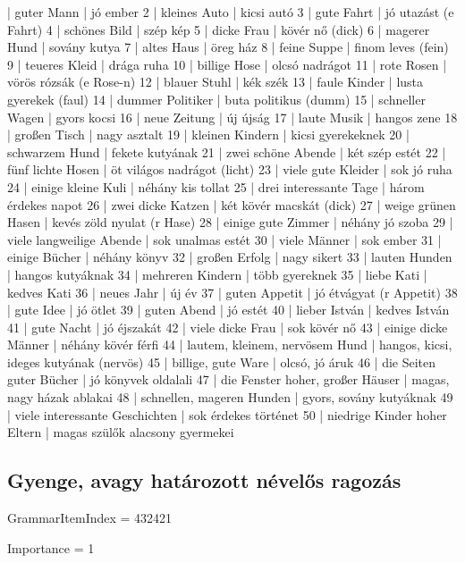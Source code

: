 \documentclass{article}
\newenvironment{exmp}{\verbatim}{\endverbatim}
\begin{document}
\begin{exmp}
1 | guter Mann | jó ember
2 | kleines Auto | kicsi autó
3 | gute Fahrt | jó utazást (e Fahrt)
4 | schönes Bild | szép kép
5 | dicke Frau | kövér nő (dick)
6 | magerer Hund | sovány kutya
7 | altes Haus | öreg ház
8 | feine Suppe | finom leves (fein)
9 | teueres Kleid | drága ruha
10 | billige Hose | olcsó nadrágot
11 | rote Rosen | vörös rózsák (e Rose-n)
12 | blauer Stuhl | kék szék
13 | faule Kinder | lusta gyerekek (faul)
14 | dummer Politiker | buta politikus (dumm)
15 | schneller Wagen | gyors kocsi
16 | neue Zeitung | új újság
17 | laute Musik | hangos zene
18 | großen Tisch | nagy asztalt
19 | kleinen Kindern | kicsi gyerekeknek
20 | schwarzem Hund | fekete kutyának
21 | zwei schöne Abende | két szép estét
22 | fünf lichte Hosen | öt világos nadrágot (licht)
23 | viele gute Kleider | sok jó ruha
24 | einige kleine Kuli | néhány kis tollat
25 | drei interessante Tage | három érdekes napot
26 | zwei dicke Katzen | két kövér macskát (dick)
27 | weige grünen Hasen | kevés zöld nyulat (r Hase)
28 | einige gute Zimmer | néhány jó szoba
29 | viele langweilige Abende | sok unalmas estét
30 | viele Männer | sok ember
31 | einige Bücher | néhány könyv
32 | großen Erfolg | nagy sikert
33 | lauten Hunden | hangos kutyáknak
34 | mehreren Kindern | több gyereknek
35 | liebe Kati | kedves Kati
36 | neues Jahr | új év
37 | guten Appetit | jó étvágyat (r Appetit)
38 | gute Idee | jó ötlet
39 | guten Abend | jó estét
40 | lieber István | kedves István
41 | gute Nacht | jó éjszakát
42 | viele dicke Frau | sok kövér nő
43 | einige dicke Männer | néhány kövér férfi 
44 | lautem, kleinem, nervösem Hund | hangos, kicsi, ideges kutyának (nervös)
45 | billige, gute Ware | olcsó, jó áruk
46 | die Seiten guter Bücher | jó könyvek oldalali
47 | die Fenster hoher, großer Häuser | magas, nagy házak ablakai
48 | schnellen, mageren Hunden | gyors, sovány kutyáknak
49 | viele interessante Geschichten | sok érdekes történet
50 | niedrige Kinder hoher Eltern | magas szülők alacsony gyermekei
\end{exmp}

\subsection{Gyenge, avagy határozott névelős ragozás}

GrammarItemIndex = 432421

Importance = 1
\end{document}
